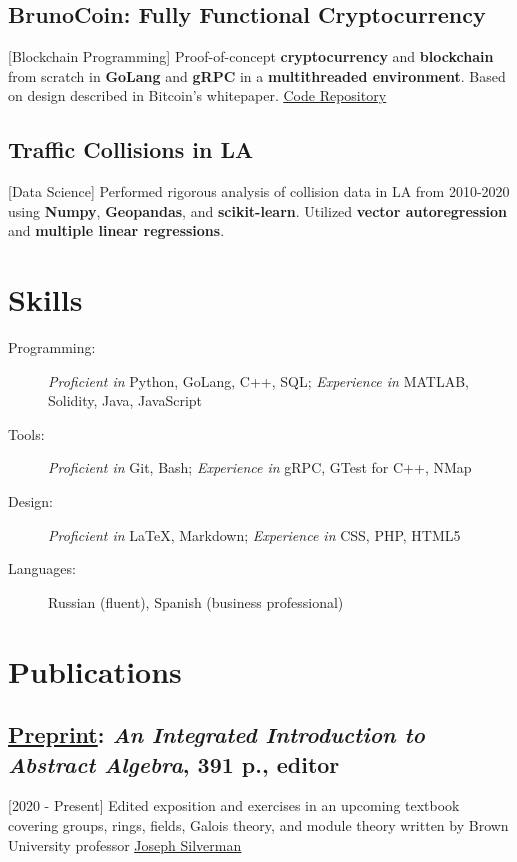\documentclass{mycv}
\begin{document}
\subsection{BrunoCoin: Fully Functional Cryptocurrency}[Blockchain Programming]
Proof-of-concept \textbf{cryptocurrency} and \textbf{blockchain} from scratch in \textbf{GoLang} and \textbf{gRPC} in a \textbf{multithreaded environment}. Based on design described in Bitcoin's whitepaper. \href{https://github.com/alizma/BrunoCoin}{\underline{Code Repository}}

\subsection{Traffic Collisions in LA}[Data Science]
Performed rigorous analysis of collision data in LA from 2010-2020 using \textbf{Numpy}, \textbf{Geopandas}, and \textbf{scikit-learn}. Utilized \textbf{vector autoregression} and \textbf{multiple linear regressions}.



\section{Skills}

\begin{description}
  \item[Programming:] \textit{Proficient in} Python, GoLang, C++, SQL; \textit{Experience in} MATLAB, Solidity, Java, JavaScript
  \item[Tools:] \textit{Proficient in} Git, Bash; \textit{Experience in} gRPC, GTest for C++, NMap 
  \item[Design:] \textit{Proficient in} \LaTeX, Markdown; \textit{Experience in} CSS, PHP, HTML5 
  \item[Languages:] Russian (fluent), Spanish (business professional) 

\end{description}


\section{Publications}
\subsection{\underline{Preprint}: \textit{An Integrated Introduction to Abstract Algebra}, 391 p., editor}[2020 - Present] 
Edited exposition and exercises in an upcoming textbook covering groups, rings, fields, Galois theory, and module theory written by Brown University professor \href{http://www.math.brown.edu/johsilve/}{\underline{Joseph Silverman}}
\end{document}
